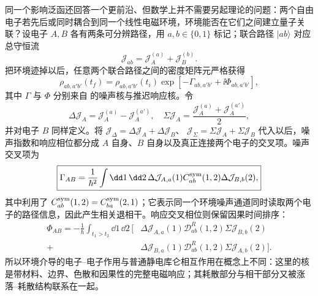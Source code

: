 同一个影响泛函还回答一个更前沿、但数学上并不需要另起理论的问题：两个自由电子若先后或同时耦合到同一个线性电磁环境，环境能否在它们之间建立量子关联？设电子 $A,B$ 各有两条可分辨路径，用 $a,b\in\{0,1\}$ 标记；联合路径 $|ab\rangle$ 对应总守恒流
\begin{equation*}
\mathcal J_{ab}=\mathcal J_A^{(a)}+\mathcal J_B^{(b)}.
\end{equation*}
把环境迹掉以后，任意两个联合路径之间的密度矩阵元严格获得
\begin{equation}
\boxed{
\rho_{ab,a'b'}(t_f)
=\rho_{ab,a'b'}(t_i)
\exp\!\left[-\Gamma_{ab,a'b'}+\ii\Phi_{ab,a'b'}\right],}
\label{eq:two_electron_environment_influence_matrix}
\end{equation}
其中 $\Gamma$ 与 $\Phi$ 分别来自 的噪声核与推迟响应核。令
\[
\Delta\mathcal J_A=\mathcal J_A^{(a)}-\mathcal J_A^{(a')},
\quad
\Sigma\mathcal J_A=\frac{\mathcal J_A^{(a)}+\mathcal J_A^{(a')}}2,
\]
并对电子 $B$ 同样定义。将
$\mathcal J_\Delta=\Delta\mathcal J_A+\Delta\mathcal J_B$、
$\mathcal J_\Sigma=\Sigma\mathcal J_A+\Sigma\mathcal J_B$
代入以后，噪声指数和响应相位都分成 $A$ 自身、$B$ 自身以及真正连接两个电子的交叉项。噪声交叉项为
\begin{equation}
\boxed{
\Gamma_{AB}
=\frac1{\hbar^2}
\int\dd1\,\dd2\,
\Delta\mathcal J_{A,a}(1)
C_{ab}^{\rm sym}(1,2)
\Delta\mathcal J_{B,b}(2),}
\label{eq:two_electron_cross_decoherence_kernel}
\end{equation}
其中利用了 $C_{ab}^{\rm sym}(1,2)=C_{ba}^{\rm sym}(2,1)$；它表示同一个环境噪声通道同时读取两个电子的路径信息，因此产生相关退相干。响应交叉相位则保留因果时间排序：
\begin{equation}
\boxed{
\begin{aligned}
\Phi_{AB}
=-\frac1\hbar
\int_{t_1>t_2}\dd1\,\dd2\,
\Big[&\Delta\mathcal J_{A,a}(1)
\mathcal D^R_{ab}(1,2)
\Sigma\mathcal J_{B,b}(2)\\
+&\Delta\mathcal J_{B,a}(1)
\mathcal D^R_{ab}(1,2)
\Sigma\mathcal J_{A,b}(2)\Big].
\end{aligned}}
\label{eq:two_electron_retarded_cross_phase}
\end{equation}
所以环境介导的电子--电子作用与普通静电库仑相互作用在概念上不同：这里的核是带材料、边界、色散和因果性的完整电磁响应；其耗散部分与相干部分又被涨落--耗散结构联系在一起。


